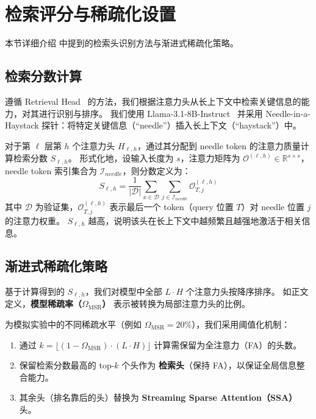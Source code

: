 

\section{检索评分与稀疏化设置}
\label{appendix:preliminary_settings}
本节详细介绍  中提到的检索头识别方法与渐进式稀疏化策略。

\subsection{检索分数计算}
遵循 Retrieval Head~\citep{wu2024retrieval} 的方法，我们根据注意力头从长上下文中检索关键信息的能力，对其进行识别与排序。
我们使用 Llama-3.1-8B-Instruct~\citep{grattafiori2024llama} 并采用 Needle-in-a-Haystack 探针：将特定关键信息（“needle”）插入长上下文（“haystack”）中。

对于第 $\ell$ 层第 $h$ 个注意力头 $H_{\ell,h}$，通过其分配到 needle token 的注意力质量计算检索分数 $S_{\ell,h}$。
形式化地，设输入长度为 $s$，注意力矩阵为 $\mathcal{O}^{(\ell, h)} \in \mathbb{R}^{s \times s}$，needle token 索引集合为 $\mathcal{I}_{needle}$，则分数定义为：
\begin{equation}
    S_{\ell,h} = \frac{1}{|\mathcal{D}|} \sum_{x \in \mathcal{D}} \sum_{j \in \mathcal{I}_{needle}} \mathcal{O}^{(\ell, h)}_{T, j}
\end{equation}
其中 $\mathcal{D}$ 为验证集，$\mathcal{O}^{(\ell, h)}_{T, j}$ 表示最后一个 token（query 位置 $T$）对 needle 位置 $j$ 的注意力权重。
$S_{\ell,h}$ 越高，说明该头在长上下文中越频繁且越强地激活于相关信息。

\subsection{渐进式稀疏化策略}
基于计算得到的 $S_{\ell,h}$，我们对模型中全部 $L \cdot H$ 个注意力头按降序排序。
如正文定义，\textbf{模型稀疏率（$\Omega_{\mathrm{MSR}}$）} 表示被转换为局部注意力头的比例。

为模拟实验中的不同稀疏水平（例如 $\Omega_{\mathrm{MSR}} = 20\%$），我们采用阈值化机制：
\begin{enumerate}
    \item 通过 $k = \lfloor (1-\Omega_{\mathrm{MSR}}) \cdot (L \cdot H) \rfloor$ 计算需保留为全注意力（FA）的头数。
    \item 保留检索分数最高的 top-$k$ 个头作为 \textbf{检索头}（保持 FA），以保证全局信息整合能力。
    \item 其余头（排名靠后的头）替换为 \textbf{Streaming Sparse Attention（SSA）} 头。
\end{enumerate}



